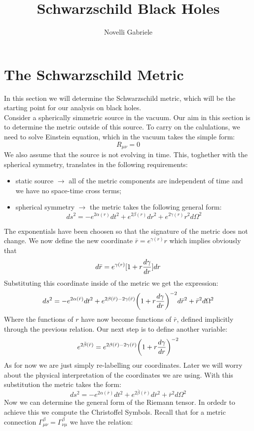 \documentclass[]{article}
\title{Schwarzschild Black Holes}
\author{Novelli Gabriele}
\date{ }
\theoremstyle{definition}
\theoremstyle{Theorem}
\theoremstyle{definition}
\theoremstyle{definition}
\theoremstyle{definition}
\begin{document}
\maketitle

\section{The Schwarzschild Metric}
In this section we will determine the Schwarzschild metric, which will be the starting point for our analysis on black holes.\\
Consider a spherically simmetric source in the vacuum. Our aim in this section is to determine the metric outside of this source. To carry on the calulations, we need to solve Einstein equation, which in the vacuum takes the simple form:
$$R_{\mu\nu}=0$$
We also assume that the source is not evolving in time. This, toghether with the spherical symmetry, translates in the following requirements: 
\begin{itemize}
	\item static source $\rightarrow$ all of the metric components are independent of time and we have no space-time cross terms;
	\item spherical symmetry $\rightarrow$ the metric takes the following general form:
	$$ds^2=-e^{2\alpha(r)}dt^2+e^{2\beta(r)}dr^2+e^{2\gamma(r)}r^2d\Omega^2$$
\end{itemize}
The exponentials have been choosen so that the signature of the metric does not change. We now define the new coordinate $\bar{r}=e^{\gamma(r)}r$ which implies obviously that $$d\bar{r}=e^{\gamma(r)}[1+r{d\gamma\over dr}]dr$$
Substituting this coordinate inside of the metric we get the expression:
$$ds^2=-e^{2\alpha(\bar{r})}dt^2+e^{2\beta(\bar{r})-2\gamma(\bar{r})}\bigg(1+r{d\gamma\over dr}\bigg)^{-2}d\bar{r}^2+\bar{r}^2d\Omega^2$$
Where the functions of $r$ have now become functions of $\bar{r}$, defined implicitly through the previous relation. Our next step is to define another variable:
$$e^{2\bar{\beta}(\bar{r})}=e^{2\beta(\bar{r})-2\gamma(\bar{r})}\bigg(1+r{d\gamma\over dr}\bigg)^{-2}$$ 
As for now we are just simply re-labelling our coordinates. Later we will worry about the physical interpretation of the coordinates we are using. With this substitution the metric takes the form:
$$ds^2=-e^{2\alpha(\bar{r})}dt^2+e^{2\bar\beta(\bar{r})}d\bar{r}^2+\bar{r}^2d\Omega^2$$
Now we can determine the general form of the Riemann tensor. In ordedr to achieve this we compute the Christoffel Symbols. Recall that for a metric connection $\Gamma_{\mu\nu}^\beta=\Gamma_{\nu\mu}^\beta$ we have the relation:
\end{document}
